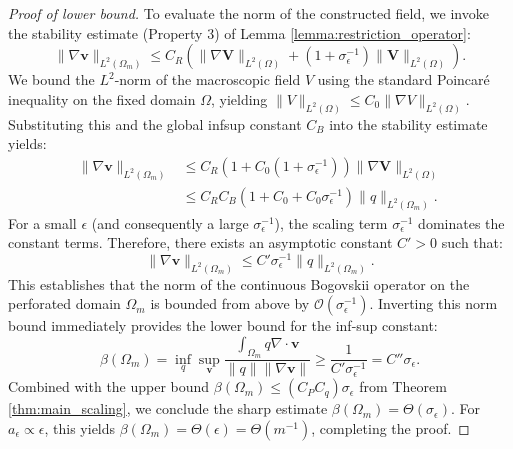 \documentclass{elsarticle}
\begin{document}
\begin{proof}[Proof of lower bound]
    To evaluate the norm of the constructed field, we invoke the stability estimate (Property 3) of Lemma \ref{lemma:restriction_operator}:
    \begin{equation}
        \|\nabla \mathbf{v}\|_{L^2(\Omega_m)} \le C_R \left( \|\nabla \mathbf{V}\|_{L^2(\Omega)} + (1 + \sigma_{\epsilon}^{-1}) \|\mathbf{V}\|_{L^2(\Omega)} \right).
    \end{equation}
    We bound the $L^2$-norm of the macroscopic field $V$ using the standard Poincaré inequality on the fixed domain $\Omega$, yielding $\|V\|_{L^2(\Omega)} \le C_0 \|\nabla V\|_{L^2(\Omega)}$. Substituting this and the global infsup constant $C_B$ into the stability estimate yields:
    \begin{align} \label{eq:lower_bound_est}
        \|\nabla \mathbf{v}\|_{L^2(\Omega_m)} & \le C_R \left( 1 + C_0(1 + \sigma_{\epsilon}^{-1}) \right) \|\nabla \mathbf{V}\|_{L^2(\Omega)} \nonumber \\
                                              & \le C_R C_B \left( 1 + C_0 + C_0 \sigma_{\epsilon}^{-1} \right) \|q\|_{L^2(\Omega_m)}.
    \end{align}
    For a small $\epsilon$ (and consequently a large $\sigma_{\epsilon}^{-1}$), the scaling term $\sigma_{\epsilon}^{-1}$ dominates the constant terms. Therefore, there exists an asymptotic constant $C' > 0$ such that:
    \begin{equation}
        \|\nabla \mathbf{v}\|_{L^2(\Omega_m)} \le C' \sigma_{\epsilon}^{-1} \|q\|_{L^2(\Omega_m)}.
    \end{equation}
    This establishes that the norm of the continuous Bogovskii operator on the perforated domain $\Omega_m$ is bounded from above by $\mathcal{O}(\sigma_{\epsilon}^{-1})$. Inverting this norm bound immediately provides the lower bound for the inf-sup constant:
    \begin{equation}
        \beta(\Omega_m) = \inf_{q} \sup_{\mathbf{v}} \frac{\int_{\Omega_m} q \nabla \cdot \mathbf{v}}{\|q\| \|\nabla \mathbf{v}\|} \ge \frac{1}{C' \sigma_{\epsilon}^{-1}} = C'' \sigma_{\epsilon}.
    \end{equation}
    Combined with the upper bound $\beta(\Omega_m) \le (C_P C_q) \sigma_{\epsilon}$ from Theorem \ref{thm:main_scaling}, we conclude the sharp estimate $\beta(\Omega_m) = \Theta(\sigma_{\epsilon})$. For $a_{\epsilon} \propto \epsilon$, this yields $\beta(\Omega_m) = \Theta(\epsilon) = \Theta(m^{-1})$, completing the proof.
\end{proof}
\end{document}
